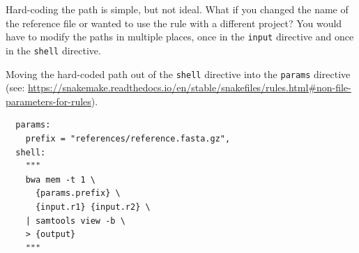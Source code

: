 \begin{questions}

Hard-coding the path is simple, but not ideal. What if you changed the name of the reference file or wanted to use the rule with a
different project? You would have to modify the paths in multiple places, once in the \texttt{input} directive and once in the
\texttt{shell} directive.

Moving the hard-coded path out of the \texttt{shell} directive into the \texttt{params} directive
(see: \url{https://snakemake.readthedocs.io/en/stable/snakefiles/rules.html#non-file-parameters-for-rules}).

\begin{answer}

\begin{lstlisting}
  params:
    prefix = "references/reference.fasta.gz",
  shell:
    """
    bwa mem -t 1 \
      {params.prefix} \
      {input.r1} {input.r2} \
    | samtools view -b \
    > {output}
    """
\end{lstlisting}

\end{answer}

\end{questions}

